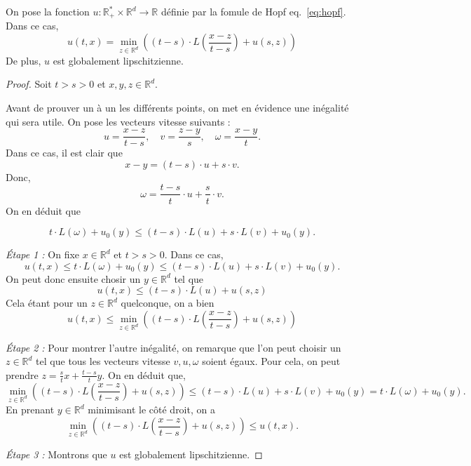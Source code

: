 \documentclass[10pt]{article}
\newcommand{\R}{\mathbb{R}}
\begin{document}
\prop On pose la fonction $u : \R^*_+ \times  \R^d \to \R$ définie par la fomule de Hopf eq.~\ref{eq:hopf}. Dans ce cas,
\[
	u(t,x) = \min_{z \in \R^d}\left(
	(t-s) \cdot L \left(\frac{x-z}{t-s}\right) + u(s,z)
	\right)
\]
De plus, $u$ est globalement lipschitzienne.

\begin{proof}
	Soit $t > s > 0$ et $x,y,z \in \R^d$.

	\medskip

	Avant de prouver un à un les différents points, on met en évidence une inégalité qui sera utile. On pose les vecteurs vitesse suivants :
	\[
		u = \frac{x-z}{t-s}, \quad v = \frac{z-y}{s}, \quad \omega = \frac{x-y}{t}.
	\]
	Dans ce cas, il est clair que
	\[
		x-y = (t-s) \cdot u + s \cdot v.
	\]
	Donc,
	\[
		\omega = \frac{t-s}{t} \cdot u + \frac{s}{t}\cdot v.
	\]
	On en déduit que

	\[
		t \cdot L(\omega) + u_0(y) \le
		(t-s) \cdot L(u) + s \cdot L(v) + u_0(y).
	\]

	\medskip

	\emph{Étape 1 : } On fixe $x \in \R^d$ et $t>s>0$.
	Dans ce cas,
	\[
		u(t,x) \le t \cdot L(\omega) + u_0(y) \le
		(t-s) \cdot L(u) + s \cdot L(v) + u_0(y).
	\]
	On peut donc ensuite chosir un $y \in \R^d$ tel que
	\[
		u(t,x) \le
		(t-s) \cdot L(u) + u(s,z)
	\]
	Cela étant pour un $z \in \R^d$ quelconque, on a bien
	\[
		u(t,x) \le
		\min_{z\in \R^d} \left((t-s) \cdot L\left(\frac{x-z}{t-s}\right) + u(s,z) \right)
	\]

	\medskip

	\emph{Étape 2 : } Pour montrer l'autre inégalité, on remarque que l'on peut
	choisir un $z \in \R^d$ tel que tous les vecteurs vitesse $v,u,\omega$ soient égaux.
	Pour cela, on peut prendre $z = \frac{s}{t} x + \frac{t-s}{t} y$. On en déduit que,
	\[
		\min_{z\in \R^d} \left((t-s) \cdot L\left(\frac{x-z}{t-s}\right) + u(s,z) \right)\le
		(t-s) \cdot L(u) + s \cdot L(v) + u_0(y)=
		t \cdot L(\omega) + u_0(y).
	\]
	En prenant $y \in \R^d$ minimisant le côté droit, on a
	\[
		\min_{z\in \R^d} \left((t-s) \cdot L\left(\frac{x-z}{t-s}\right) + u(s,z) \right)\le
		u(t,x).
	\]

	\emph{Étape 3 : } Montrons que $u$ est globalement lipschitzienne.


\end{proof}
\end{document}
